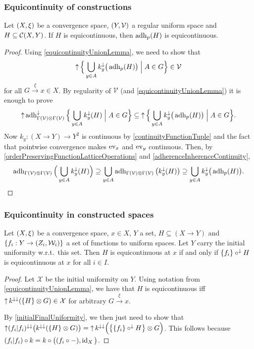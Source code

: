 \subsubsection{Equicontinuity of constructions}
\begin{proposition} \label{pointwiseAdherenceEquicontinuous}
Let $\sSet{X,\xi}$ be a convergence space, $\sSet{Y, \mathcal{V}}$ a regular uniform space and $H \subseteq \operatorname{\mathcal{C}}(X, Y)$. If $H$ is equicontinuous, then $\operatorname{adh}_p(H)$ is equicontinuous.
\end{proposition}
\begin{proof}
Using \ref{equicontinuityUnionLemma}, we need to show that
\[ \upset \setbuilder[\Big]{\bigcup_{y\in A}k_y^\imf\big(\adh_p(H)\big)}{A\in G} \in \mathcal{V} \]
for all $G\overset{\xi}{\longrightarrow} x\in X$. By regularity of $\mathcal{V}$ (and \ref{equicontinuityUnionLemma}) it is enough to prove
\[ \upset\adh_{\Gamma(\mathcal{V})\otimes\Gamma(\mathcal{V})}^\imf\setbuilder[\Big]{\bigcup_{y\in A}k_y^\imf(H)}{A\in G} \subseteq \upset\setbuilder[\Big]{\bigcup_{y\in A}k_y^\imf\big(\adh_p(H)\big)}{A\in G}. \]
Now $k_y: (X\to Y) \to Y^2$ is continuous by \ref{continuityFunctionTuple} and the fact that pointwise convergence makes $\operatorname{ev}_x$ and $\operatorname{ev}_y$ continuous. Then, by \ref{orderPreservingFunctionLatticeOperations} and \ref{adherenceInherenceContinuity},
\[ \operatorname{adh}_{\Gamma(\mathcal{V})\otimes\Gamma(\mathcal{V})}\Big(\bigcup_{y\in A}k_y^\downarrow(H)\Big) \supseteq \bigcup_{y\in A}\operatorname{adh}_{\Gamma(\mathcal{V})\otimes\Gamma(\mathcal{V})}\big(k_y^\downarrow(H)\big) \supseteq \bigcup_{y\in A}k_y^\downarrow\big(\operatorname{adh}_p(H)\big). \]
\end{proof}

\subsubsection{Equicontinuity in constructed spaces}
\begin{proposition}
Let $\sSet{X,\xi}$ be a convergence space, $x\in X$, $Y$ a set, $H\subseteq (X\to Y)$ and $\{f_i: Y\to \sSet{Z_i, \mathcal{W}_i}\}$ a set of functions to uniform spaces. Let $Y$ carry the initial uniformity w.r.t.\ this set. Then $H$ is equicontinuous at $x$ \textup{if and only if} $\{f_i\}\circ^\downarrow H$ is equicontinuous at $x$ for all $i\in I$.
\end{proposition}
\begin{proof}
Let $\mathcal{X}$ be the initial uniformity on $Y$.
Using notation from \ref{equicontinuityUnionLemma}, we have that $H$ is equicontinuous iff $\operatorname{\uparrow} k^{\downarrow\downarrow}(\{H\}\otimes G) \in \mathcal{X}$ for arbitrary $G\overset{\xi}{\longrightarrow} x$.

By \ref{initialFinalUniformity}, we then just need to show that $\operatorname{\uparrow}(f_i|f_i)^{\downarrow\downarrow}\big(k^{\downarrow\downarrow}(\{H\}\otimes G)\big) = \operatorname{\uparrow} k^{\downarrow\downarrow}\Big(\big\{\{f_i\}\circ^\downarrow H\big\}\otimes G\Big)$. This follows because $(f_i|f_i)\circ k = k\circ \big((f_i\circ -), \operatorname{id}_X\big)$.
\end{proof}

